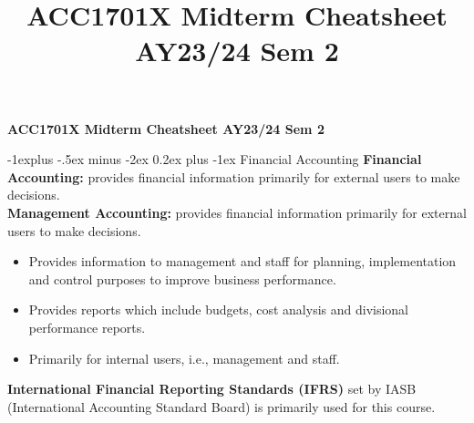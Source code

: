 \documentclass[10pt,landscape]{article}
\title{ACC1701X Midterm Cheatsheet AY23/24 Sem 2}
\makeatletter
\renewcommand{\subsection}{\@startsection{subsection}{2}{0mm}%
                                {-1explus -.5ex minus -2ex}%
                                {0.2ex plus -1ex}%
                                {\normalfont\small\bfseries}}
\makeatother
\begin{document}
\raggedright
\footnotesize

\begin{center}
     \Large{\textbf{ACC1701X Midterm Cheatsheet AY23/24 Sem 2}} \\
\end{center}
\begin{multicols}{3}
\setlength{\premulticols}{1pt}
\setlength{\postmulticols}{1pt}
\setlength{\multicolsep}{1pt}
\setlength{\columnsep}{2pt}
\begin{scriptsize}

\subsection{Financial Accounting}
\textbf{Financial Accounting:} provides financial information primarily for external users to make decisions.\\
\textbf{Management Accounting:} provides financial information primarily for external users to make decisions.
\begin{itemize} \itemsep -2pt
    \item Provides information to management and staff for planning, implementation and control purposes to improve business performance.
    \item Provides reports which include budgets, cost analysis and 
    divisional performance reports.
    \item Primarily for internal users, i.e., management and staff.
\end{itemize}
\textbf{International Financial Reporting Standards (IFRS)} set by IASB (International Accounting Standard Board) is primarily used for this course.


\end{scriptsize}
\end{multicols}
\end{document}
